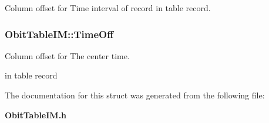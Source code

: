 Column offset for Time interval of record in table record. 

\subsubsection{ {\bf Obit\-Table\-IM::Time\-Off}}\label{structObitTableIM_o27}


Column offset for The center time. 

in table record 

The documentation for this struct was generated from the following file:\begin{CompactItemize}
\item 
{\bf Obit\-Table\-IM.h}\end{CompactItemize}
